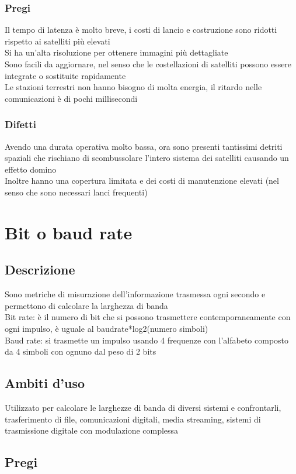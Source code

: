 \documentclass[10pt,oneside,a4paper]{article}
\begin{document}
\subsubsection{Pregi}
Il tempo di latenza è molto breve, i costi di lancio e costruzione sono ridotti rispetto ai satelliti più elevati\\
Si ha un'alta risoluzione per ottenere immagini più dettagliate\\
Sono facili da aggiornare, nel senso che le costellazioni di satelliti possono essere integrate o sostituite rapidamente\\
Le stazioni terrestri non hanno bisogno di molta energia, il ritardo nelle comunicazioni è di pochi millisecondi
\subsubsection{Difetti}
Avendo una durata operativa molto bassa, ora sono presenti tantissimi detriti spaziali che rischiano di scombussolare l'intero sistema dei satelliti causando un effetto domino\\
Inoltre hanno una copertura limitata e dei costi di manutenzione elevati (nel senso che sono necessari lanci frequenti)
\section{Bit o baud rate}
\subsection{Descrizione}
Sono metriche di misurazione dell'informazione trasmessa ogni secondo e permettono di calcolare la larghezza di banda\\
Bit rate: è il numero di bit che si possono trasmettere contemporaneamente con ogni impulso, è uguale al baudrate*log2(numero simboli)\\
Baud rate: si trasmette un impulso usando 4 frequenze con l'alfabeto composto da 4 simboli con ognuno dal peso di 2 bits
\subsection{Ambiti d'uso}
Utilizzato per calcolare le larghezze di banda di diversi sistemi e confrontarli, trasferimento di file, comunicazioni digitali, media streaming, sistemi di trasmissione digitale con modulazione complessa
\subsection{Pregi}
\end{document}

